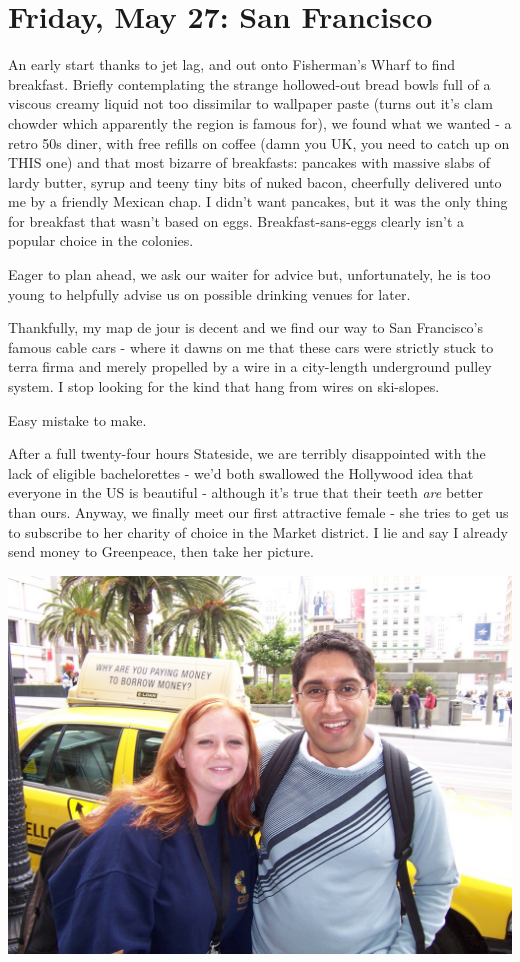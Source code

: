 \documentclass[a5paper,titlepage,11pt]{book}
\begin{document}
\chapter[San Francisco]{Friday, May 27: San Francisco}
An early start thanks to jet lag, and out onto Fisherman's Wharf to find breakfast.  Briefly contemplating the strange hollowed-out bread bowls full of a viscous creamy liquid not too dissimilar to wallpaper paste (turns out it's clam chowder which apparently the region is famous for), we found what we wanted - a retro 50s diner, with free refills on coffee (damn you UK, you need to catch up on THIS one) and that most bizarre of breakfasts: pancakes with massive slabs of lardy butter, syrup and teeny tiny bits of nuked bacon, cheerfully delivered unto me by a friendly Mexican chap.  I didn't want pancakes, but it was the only thing for breakfast that wasn't based on eggs.  Breakfast-sans-eggs clearly isn't a popular choice in the colonies.

Eager to plan ahead, we ask our waiter for advice but, unfortunately, he is too young to helpfully advise us on possible drinking venues for later.

Thankfully, my map de jour is decent and we find our way to San Francisco's famous cable cars - where it dawns on me that these cars were strictly stuck to terra firma and merely propelled by a wire in a city-length underground pulley system.  I stop looking for the kind that hang from wires on ski-slopes.

Easy mistake to make.

After a full twenty-four hours Stateside, we are terribly disappointed with the lack of eligible bachelorettes - we'd both swallowed the Hollywood idea that everyone in the US is beautiful - although it's true that their teeth \emph{are} better than ours.  Anyway, we finally meet our first attractive female - she tries to get us to subscribe to her charity of choice in the Market district.  I lie and say I already send money to Greenpeace, then take her picture.

\begin{center}\includegraphics[width=\textwidth]{gfx/100_1016}\end{center}
\end{document}
